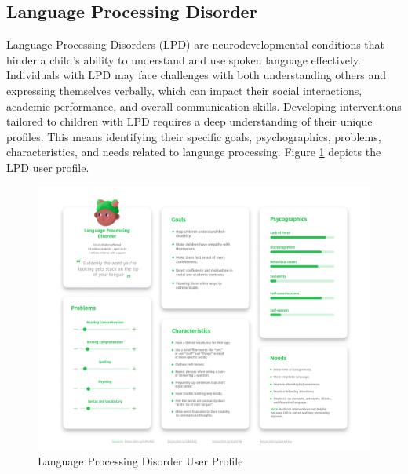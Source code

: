 \subsection{Language Processing Disorder}
Language Processing Disorders (LPD) are neurodevelopmental conditions that hinder a child’s ability to understand and use spoken language effectively. Individuals with LPD may face challenges with both understanding others and expressing themselves verbally, which can impact their social interactions, academic performance, and overall communication skills. Developing interventions tailored to children with LPD requires a deep understanding of their unique profiles. This means identifying their specific goals, psychographics, problems, characteristics, and needs related to language processing. Figure \ref{fig:lpdUserProfile} depicts the LPD user profile.

\begin{figure}[H]
    \centering
    \includegraphics[width=1\linewidth]{Chapters/figma/Language Processing Disorder.png}
    \caption{Language Processing Disorder User Profile}
    \label{fig:lpdUserProfile}
\end{figure}

